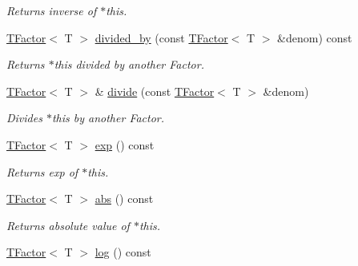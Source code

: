\begin{CompactItemize}
\begin{CompactList}\small\item\em Returns inverse of $\ast$this. \item\end{CompactList}\item 
\hypertarget{classdai_1_1TFactor_1747eaa67d359d34d9221d368753ecdf}{
\hyperlink{classdai_1_1TFactor}{TFactor}$<$ T $>$ \hyperlink{classdai_1_1TFactor_1747eaa67d359d34d9221d368753ecdf}{divided\_\-by} (const \hyperlink{classdai_1_1TFactor}{TFactor}$<$ T $>$ \&denom) const }
\label{classdai_1_1TFactor_1747eaa67d359d34d9221d368753ecdf}

\begin{CompactList}\small\item\em Returns $\ast$this divided by another Factor. \item\end{CompactList}\item 
\hypertarget{classdai_1_1TFactor_275c1fd149c36a9e67256d21ad97dde1}{
\hyperlink{classdai_1_1TFactor}{TFactor}$<$ T $>$ \& \hyperlink{classdai_1_1TFactor_275c1fd149c36a9e67256d21ad97dde1}{divide} (const \hyperlink{classdai_1_1TFactor}{TFactor}$<$ T $>$ \&denom)}
\label{classdai_1_1TFactor_275c1fd149c36a9e67256d21ad97dde1}

\begin{CompactList}\small\item\em Divides $\ast$this by another Factor. \item\end{CompactList}\item 
\hypertarget{classdai_1_1TFactor_284a962817d33244c261be5d7f0159ca}{
\hyperlink{classdai_1_1TFactor}{TFactor}$<$ T $>$ \hyperlink{classdai_1_1TFactor_284a962817d33244c261be5d7f0159ca}{exp} () const }
\label{classdai_1_1TFactor_284a962817d33244c261be5d7f0159ca}

\begin{CompactList}\small\item\em Returns exp of $\ast$this. \item\end{CompactList}\item 
\hypertarget{classdai_1_1TFactor_fa3435d85ca11399aba42c63a008765a}{
\hyperlink{classdai_1_1TFactor}{TFactor}$<$ T $>$ \hyperlink{classdai_1_1TFactor_fa3435d85ca11399aba42c63a008765a}{abs} () const }
\label{classdai_1_1TFactor_fa3435d85ca11399aba42c63a008765a}

\begin{CompactList}\small\item\em Returns absolute value of $\ast$this. \item\end{CompactList}\item 
\hypertarget{classdai_1_1TFactor_fbbcf3a69afa5fb3bde1f5a8180860c6}{
\hyperlink{classdai_1_1TFactor}{TFactor}$<$ T $>$ \hyperlink{classdai_1_1TFactor_fbbcf3a69afa5fb3bde1f5a8180860c6}{log} () const }
\label{classdai_1_1TFactor_fbbcf3a69afa5fb3bde1f5a8180860c6}


\end{CompactItemize}

